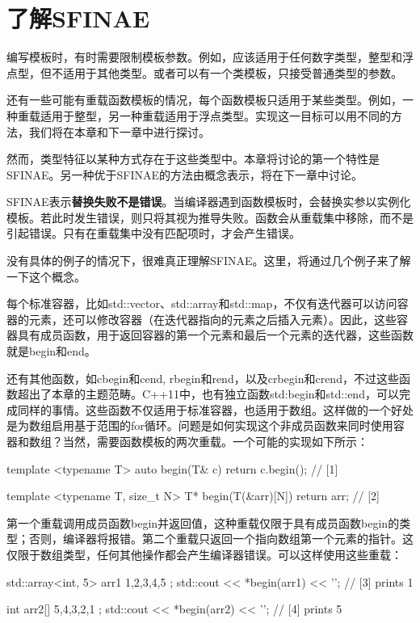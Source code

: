 \section{了解SFINAE}
编写模板时，有时需要限制模板参数。例如，应该适用于任何数字类型，整型和浮点型，但不适用于其他类型。或者可以有一个类模板，只接受普通类型的参数。

还有一些可能有重载函数模板的情况，每个函数模板只适用于某些类型。例如，一种重载适用于整型，另一种重载适用于浮点类型。实现这一目标可以用不同的方法，我们将在本章和下一章中进行探讨。

然而，类型特征以某种方式存在于这些类型中。本章将讨论的第一个特性是SFINAE。另一种优于SFINAE的方法由概念表示，将在下一章中讨论。

SFINAE表示\textbf{替换失败不是错误}。当编译器遇到函数模板时，会替换实参以实例化模板。若此时发生错误，则只将其视为推导失败。函数会从重载集中移除，而不是引起错误。只有在重载集中没有匹配项时，才会产生错误。

没有具体的例子的情况下，很难真正理解SFINAE。这里，将通过几个例子来了解一下这个概念。

每个标准容器，比如std::vector、std::array和std::map，不仅有迭代器可以访问容器的元素，还可以修改容器（在迭代器指向的元素之后插入元素）。因此，这些容器具有成员函数，用于返回容器的第一个元素和最后一个元素的迭代器，这些函数就是begin和end。

还有其他函数，如cbegin和cend, rbegin和rend，以及crbegin和crend，不过这些函数超出了本章的主题范畴。C++11中，也有独立函数std:begin和std::end，可以完成同样的事情。这些函数不仅适用于标准容器，也适用于数组。这样做的一个好处是为数组启用基于范围的for循环。问题是如何实现这个非成员函数来同时使用容器和数组？当然，需要函数模板的两次重载。一个可能的实现如下所示：

\begin{cpp}
template <typename T>
auto begin(T& c) { return c.begin(); } // [1]

template <typename T, size_t N>
T* begin(T(&arr)[N]) {return arr; } // [2]
\end{cpp}

第一个重载调用成员函数begin并返回值，这种重载仅限于具有成员函数begin的类型；否则，编译器将报错。第二个重载只返回一个指向数组第一个元素的指针。这仅限于数组类型，任何其他操作都会产生编译器错误。可以这样使用这些重载：

\begin{cpp}
std::array<int, 5> arr1{ 1,2,3,4,5 };
std::cout << *begin(arr1) << '\n'; // [3] prints 1

int arr2[]{ 5,4,3,2,1 };
std::cout << *begin(arr2) << '\n'; // [4] prints 5
\end{cpp}

